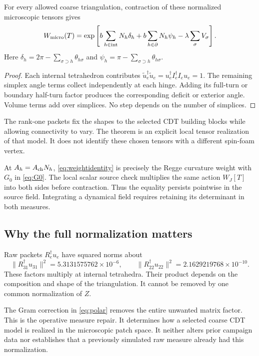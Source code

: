 \begin{theorem}
\label{thm:weight}
For every allowed coarse triangulation, contraction of these normalized microscopic tensors gives
\begin{equation}
W_{\rm micro}(T)=
\exp\left[
b\sum_{h\in{\rm int}}N_h\delta_h
+b\sum_{h\in\partial}N_h\psi_h
-\lambda\sum_\sigma V_\sigma
\right].
\label{eq:weightidentity}
\end{equation}
Here $\delta_h=2\pi-\sum_{\sigma\supset h}\theta_{h\sigma}$ and
$\psi_h=\pi-\sum_{\sigma\supset h}\theta_{h\sigma}$.
\end{theorem}
\begin{proof}
Each internal tetrahedron contributes
$\widetilde u_e^\dagger\widetilde u_e
=u_e^\dagger I_e^\dagger I_eu_e=1$.
The remaining simplex angle terms collect independently at each hinge. Adding its full-turn or boundary half-turn factor produces the corresponding deficit or exterior angle. Volume terms add over simplices. No step depends on the number of simplices.
\end{proof}

The rank-one packets fix the shapes to the selected CDT building blocks while allowing connectivity to vary. The theorem is an explicit local tensor realization of that model. It does not identify these chosen tensors with a different spin-foam vertex.

At $A_h=A_{\rm ch} N_h$, \eqref{eq:weightidentity} is precisely the Regge curvature weight with $G_0$ in \eqref{eq:G0}. The local scalar source check multiplies the same action $W_J[T]$ into both sides before contraction. Thus the equality persists pointwise in the source field. Integrating a dynamical field requires retaining its determinant in both measures.

\subsection{Why the full normalization matters}

Raw packets $R_e^\dagger u_e$ have squared norms about
\begin{equation}
\|R_{31}^\dagger u_{31}\|^2=5.3131575762\times10^{-6},\qquad
\|R_{22}^\dagger u_{22}\|^2=2.1629219768\times10^{-10}.
\end{equation}
These factors multiply at internal tetrahedra. Their product depends on the composition and shape of the triangulation. It cannot be removed by one common normalization of $Z$.

The Gram correction in \eqref{eq:polar} removes the entire unwanted matrix factor. This is the operative measure repair. It determines how a selected coarse CDT model is realized in the microscopic patch space. It neither alters prior campaign data nor establishes that a previously simulated raw measure already had this normalization.

